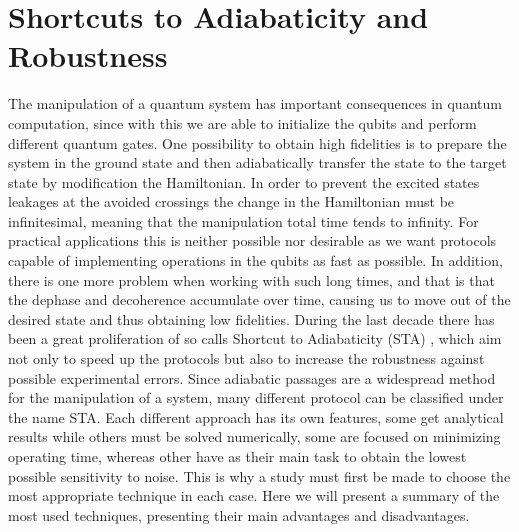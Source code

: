 
\chapter{Shortcuts to Adiabaticity and Robustness} %

\label{sec:Shortcuts_to_Adiabaticity} %


The manipulation of a quantum system has important consequences in quantum computation, since with this we are able to initialize the qubits and perform different quantum gates. One possibility to obtain high fidelities is to prepare the system in the ground state and then adiabatically transfer the state to the target state by modification the Hamiltonian. In order to prevent the excited states leakages at the avoided crossings the change in the Hamiltonian must be infinitesimal, meaning that the manipulation total time tends to infinity. For practical applications this is neither possible nor desirable as we want protocols capable of implementing operations in the qubits as fast as possible. In addition, there is one more problem when working with such long times, and that is that the dephase and decoherence accumulate over time, causing us to move out of the desired state and thus obtaining low fidelities. During the last decade there has been a great proliferation of so calls Shortcut to Adiabaticity (STA) \cite{Chen2010}, which aim not only to speed up the protocols but also to increase the robustness against possible experimental errors. Since adiabatic passages are a widespread method for the manipulation of a system, many different protocol can be classified under the name STA. Each different approach has its own features, some get analytical results while others must be solved numerically, some are focused on minimizing operating time, whereas other have as their main task to obtain the lowest possible sensitivity to noise. This is why a study must first be made to choose the most appropriate technique in each case. Here we will present a summary of the most used techniques, presenting their main advantages and disadvantages.

